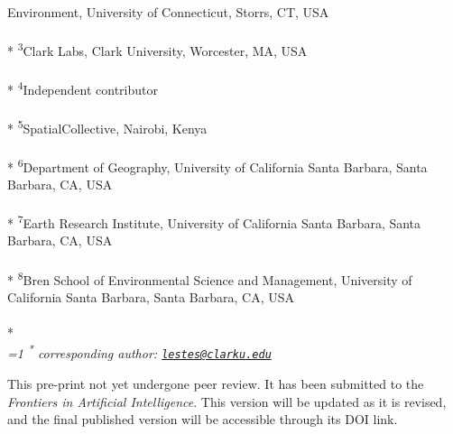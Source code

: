 \documentclass[11pt,a4paper]{article}
\begin{document}
\begin{singlespace}
\begin{justify}
Environment, University of Connecticut, Storrs, CT, USA\\\\*
\footnotesize\textsuperscript{3}Clark Labs, Clark University, Worcester,
MA, USA\\\\*
\footnotesize\textsuperscript{4}Independent contributor\\\\*
\footnotesize\textsuperscript{5}SpatialCollective, Nairobi, Kenya\\\\*
\footnotesize\textsuperscript{6}Department of Geography, University of
California Santa Barbara, Santa Barbara, CA, USA\\\\*
\footnotesize\textsuperscript{7}Earth Research Institute, University of
California Santa Barbara, Santa Barbara, CA, USA\\\\*
\footnotesize\textsuperscript{8}Bren School of Environmental Science and
Management, University of California Santa Barbara, Santa Barbara, CA,
USA\\\\*
\setcounter{num}{1}
\\[0.1cm]
\footnotesize \emph{
\ifnum\value{num}=1%
\textsuperscript{*} corresponding author:
\fi
\href{mailto:lestes@clarku.edu}{\nolinkurl{lestes@clarku.edu}}
}

This pre-print not yet undergone peer review. It has been submitted to
the \emph{Frontiers in Artificial Intelligence}. This version will be
updated as it is revised, and the final published version will be
accessible through its DOI link.


\end{justify}
\normalsize


\end{singlespace}
\end{document}
